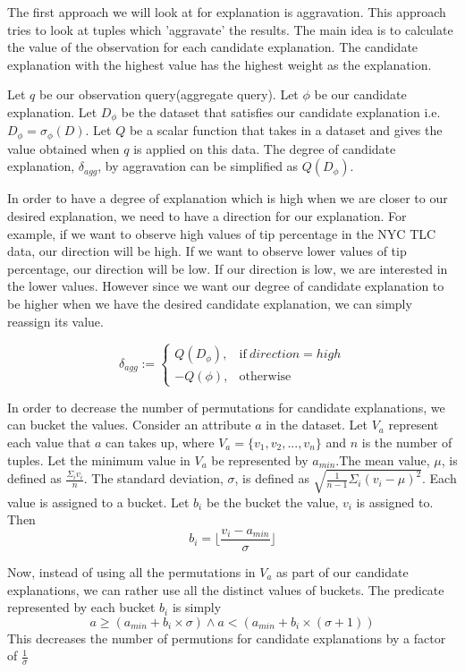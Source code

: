 The first approach we will look at for explanation is aggravation. This approach tries to look at tuples which 'aggravate' the results. The main idea is to calculate the value of the observation for each candidate explanation. The candidate explanation with the highest value has the highest weight as the explanation. 

Let $q$ be our observation query(aggregate query). Let $\phi$ be our candidate explanation. Let $D_\phi$ be the dataset that satisfies our candidate explanation i.e. $D_\phi = \sigma_\phi(D)$. Let $Q$ be a scalar function that takes in a dataset and gives the value obtained when $q$ is applied on this data. The degree of candidate explanation, $\delta_{agg}$, by aggravation can be simplified as $Q(D_\phi)$. 

In order to have a degree of explanation which is high when we are closer to our desired explanation, we need to have a direction for our explanation. For example, if we want to observe high values of tip percentage in the NYC TLC data, our direction will be high. If we want to observe lower values of tip percentage, our direction will be low. If our direction is low, we are interested in the lower values. However since we want our degree of candidate explanation to be higher when we have the desired candidate explanation, we can simply reassign its value.

\begin{equation}
\delta_{agg}:=
    \begin{cases}
      Q(D_\phi), & \text{if}\ direction=high \\
      -Q(\phi), & \text{otherwise}
    \end{cases}
\end{equation}

In order to decrease the number of permutations for candidate explanations, we can bucket the values. Consider an attribute $a$ in the dataset. Let $V_a$ represent each value that $a$ can takes up, where $V_a=\{v_1,v_2,...,v_n\}$ and $n$ is the number of tuples. Let the minimum value in $V_a$ be represented by $a_{min}$.The mean value, $\mu$, is defined as $\frac{\Sigma_iv_i}{n}$. The standard deviation, $\sigma$, is defined as $\sqrt{\frac{1}{n-1}\Sigma_i(v_i-\mu)^2}$. Each value is assigned to a bucket. Let $b_i$ be the bucket the value, $v_i$ is assigned to. Then $$b_i = \bigg \lfloor\frac{v_i-a_{min}}{\sigma} \bigg \rfloor$$

Now, instead of using all the permutations in $V_a$ as part of our candidate explanations, we can rather use all the distinct values of buckets. The predicate represented by each bucket $b_i$ is simply
$$ a \geq (a_{min}+b_i\times\sigma) \wedge a < (a_{min}+b_i\times(\sigma+1))$$
This decreases the number of permutions for candidate explanations by a factor of $\frac{1}{\sigma}$


